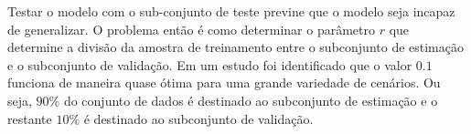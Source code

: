 Testar o modelo com o sub-conjunto de teste previne que o modelo seja incapaz de generalizar.
O problema então é como determinar o parâmetro $r$ que determine a divisão da amostra de treinamento entre o subconjunto de estimação e o subconjunto de validação. Em um estudo \cite{kearns1996bound} foi identificado que o valor $0.1$ funciona de maneira quase ótima para uma grande variedade de cenários. Ou seja, $90\%$ do conjunto de dados é destinado ao subconjunto de estimação e o restante $10\%$ é destinado ao subconjunto de validação.
